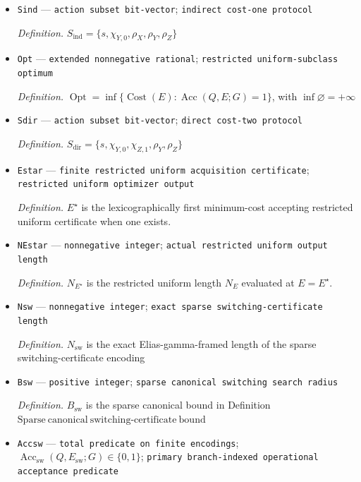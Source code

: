 \documentclass{article}
\begin{document}
\begin{itemize}
  \item \texttt{Sind} --- \texttt{action subset bit-\allowbreak{}vector}; \texttt{indirect cost-\allowbreak{}one protocol}
  \par\smallskip\noindent\emph{Definition.} \(S_{\mathrm{ind}}=\{s,\chi_{Y,0},\rho_X,\rho_Y,\rho_Z\}\)
  \item \texttt{Opt} --- \texttt{extended nonnegative rational}; \texttt{restricted uniform-\allowbreak{}subclass optimum}
  \par\smallskip\noindent\emph{Definition.} \(\operatorname{Opt}=\inf\{\operatorname{Cost}(E):\operatorname{Acc}(Q,E;G)=1\}\), with \(\inf\varnothing=+\infty\)
  \item \texttt{Sdir} --- \texttt{action subset bit-\allowbreak{}vector}; \texttt{direct cost-\allowbreak{}two protocol}
  \par\smallskip\noindent\emph{Definition.} \(S_{\mathrm{dir}}=\{s,\chi_{Y,0},\chi_{Z,1},\rho_Y,\rho_Z\}\)
  \item \texttt{Estar} --- \texttt{finite restricted uniform acquisition certificate}; \texttt{restricted uniform optimizer output}
  \par\smallskip\noindent\emph{Definition.} \(E^{\star}\) is the lexicographically first minimum-cost accepting restricted uniform certificate when one exists.
  \item \texttt{NEstar} --- \texttt{nonnegative integer}; \texttt{actual restricted uniform output length}
  \par\smallskip\noindent\emph{Definition.} \(N_{E^{\star}}\) is the restricted uniform length \(N_E\) evaluated at \(E=E^{\star}\).
  \item \texttt{Nsw} --- \texttt{nonnegative integer}; \texttt{exact sparse switching-\allowbreak{}certificate length}
  \par\smallskip\noindent\emph{Definition.} \(N_{\mathrm{sw}}\) is the exact Elias-gamma-framed length of the sparse switching-certificate encoding
  \item \texttt{Bsw} --- \texttt{positive integer}; \texttt{sparse canonical switching search radius}
  \par\smallskip\noindent\emph{Definition.} \(B_{\mathrm{sw}}\) is the sparse canonical bound in Definition \(\mathrm{Sparse\ canonical\ switching\mbox{-}certificate\ bound}\)
  \item \texttt{Accsw} --- \texttt{total predicate on finite encodings}; \(\operatorname{Acc}_{\mathrm{sw}}(Q,E_{\mathrm{sw}};G)\in\{0,1\}\); \texttt{primary branch-\allowbreak{}indexed operational acceptance predicate}

\end{itemize}
\end{document}
